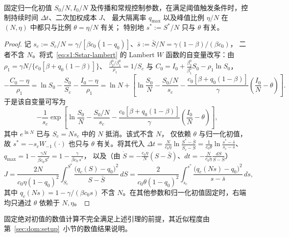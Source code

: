 \documentclass[lang=cn,a4paper,newtx]{elegantpaper}
\numberwithin{equation}{section}
\theoremstyle{plain}
\begin{document}
\begin{lemma}\label{lem:dom:scaling}
固定归一化初值 $S_0/N,I_0/N$ 及传播和常规控制参数，在满足阈值触发条件时，控制持续时间 $\Delta t$、二次加权成本 $J$、
最大隔离率 $q_{\max}$ 以及峰值比例 $\eta/N$ 在 $(N,\eta)$ 中都只与比例 $\theta=\eta/N$ 有关；
特别地 $s^*:=S^\ast/N$ 只与 $\theta$ 有关。
\end{lemma}
\begin{proof}
记 $s_c:=S_c/N=\gamma/[\beta c_0(1-q_0)]$、$\bar s:=\bar S/N=\gamma(1-\beta)/(\beta c_0)$，
二者不含 $N$。将式~\eqref{eq:s1:Sstar-lambert} 的 Lambert $W$ 函数的自变量改写：由
$\rho_1=\gamma N/\{c_0[\beta+q_0(1-\beta)]\}$、
$\frac{\beta_2^0/\beta_1^0}{\rho_1}=1/S_c$ 与
$C_0=I_0+\tfrac{\beta_2^0}{\beta_1^0}S_0-\rho_1\ln S_0$，
\[
  -\frac{C_0-\eta}{\rho_1}
  = \ln S_0-\frac{S_0}{S_c}-\frac{I_0-\eta}{\rho_1}
  = \ln N+\left[
  \ln\frac{S_0}{N}-\frac{S_0/N}{s_c}
  -\frac{c_0[\beta+q_0(1-\beta)]}{\gamma}
  \left(\frac{I_0}{N}-\theta\right)
  \right].
\]
于是该自变量可写为
\[
-\frac{1}{s_c}
\exp\left[
\ln\frac{S_0}{N}-\frac{S_0/N}{s_c}
-\frac{c_0[\beta+q_0(1-\beta)]}{\gamma}
\left(\frac{I_0}{N}-\theta\right)
\right],
\]
其中 $e^{\ln N}$ 已与 $S_c=Ns_c$ 中的 $N$ 抵消。该式不含 $N$，
仅依赖 $\theta$ 与归一化初值，故
$s^*=-s_c W_{-1}(\cdot)$ 也只与 $\theta$ 有关。将其代入
$\Delta t=\frac{N}{c_0\eta}\ln\frac{S^\ast-\bar S}{S_c-\bar S}
 =\frac{1}{c_0\theta}\ln\frac{s^*-\bar s}{s_c-\bar s}$、
$q_{\max}=1-\frac{\gamma N}{\beta c_0 S^\ast}=1-\frac{\gamma}{\beta c_0\,s^*}$，
以及（由 $\dot S=-\frac{c_0\eta}{N}(S-\bar S)$、$dt=-\frac{N}{c_0\eta}\frac{dS}{S-\bar S}$）
\begin{equation}
  J=\frac{2N}{c_0\eta(1-q_0)^2}\int_{S_c}^{S^\ast}\frac{\big(q_c(S)-q_0\big)^2}{S-\bar S}\,dS
   =\frac{2}{c_0\theta(1-q_0)^2}\int_{s_c}^{s^*}\frac{\big(q_c(N s)-q_0\big)^2}{s-\bar s}\,ds,
  \label{eq:dom:Jtheta}
\end{equation}
其中 $q_c(N s)=1-\gamma/(\beta c_0 s)$ 不含 $N$。在其他参数和归一化初值固定时，右端均只通过 $\theta$ 依赖于 $N,\eta$。
\end{proof}

固定绝对初值的数值计算不完全满足上述引理的前提，其近似程度由第~\ref{sec:dom:setup}~小节的数值结果说明。
\end{document}
